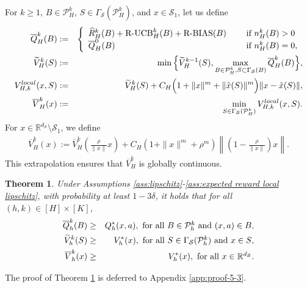 \documentclass[10pt,a4paper]{amsart}
\newtheorem{theorem}{Theorem}
\begin{document}
For $k\ge1$, $B\in\mathcal P_H^k$, $S\in\Gamma_{\mathcal S}(\mathcal P_H^k)$, and $x\in\mathcal S_1$, let us define
\begin{eqnarray}\label{eq:Q,V estimation for h=H}
     \overline{Q}_{H}^{k}(B) &:=&\left\{\begin{array}{lll}\widehat{R}_{H}^{k}(B)+\mbox{\rm R-UCB}_{H}^{k}(B)+\mbox{\rm R-BIAS}(B) && \mbox{ if } n_H^k(B)>0\\
     \overline{Q}_{H}^{0}(B) &&
       \mbox{ if } n_H^k(B)=0, 
       \end{array}\right. \nonumber\\ 
        \widetilde{V}_{H}^{k}(S)&:=&\min\Big\{\widetilde{V}_{H}^{k-1}(S), \max_{B \in \mathcal{P}_H^k,S \subset\Gamma_{\mathcal{S}}(B) }\overline{Q}_{H}^{k}(B)\Big\} ,\nonumber\\ 
         V_{H,k}^{\rm local}(x, S)&:=& \widetilde{V}_{H}^{k}(S)+C_{H}\Big(1+\|x\|^m+\|\tilde{x}(S)\|^m\Big)\|x-\tilde{x}(S)\|, \nonumber\\ 
        \overline{V}_{H}^{k}(x)&:=&\min_{S \in \Gamma_{\mathcal{S}}(\mathcal{P}_H^k)} V_{H,k}^{\rm local}(x, S).
\end{eqnarray}
For $x \in \mathbb{R}^{d_{\mathcal{S}}}\setminus\mathcal{S}_{1}$, we define 
\begin{eqnarray}\label{eq:Q,V estimation for h=H outside}
    \overline{V}_{H}^{k}(x):=\overline{V}_{H}^{k}\left(\frac{\rho}{\|x\|}x\right)+C_{H}(1+\|x\|^{m}+\rho^{m})\left\|\left(1-\frac{\rho}{\|x\|}\right)x\right\|. 
\end{eqnarray}
This extrapolation ensures that $\overline V_H^k$ is globally continuous.

\begin{theorem} \label{thm: True Upper Bounded By Estimates}
Under Assumptions \ref{ass:lipschitz}-\ref{ass:expected reward local lipschitz}, with probability at least $1-3\delta$, it holds that for all $(h,k) \in [H]\times[K]$, 
\begin{eqnarray}\label{eq:upperbound}
     \overline{Q}_{h}^{k}(B)&\geq& Q_{h}^{*}(x,a),\,\, \mbox{for all $B \in \mathcal{P}_h^k $ and  $ (x,a) \in B$}, \nonumber\\
     \widetilde{V}_{h}^{k}(S)&\geq& V_{h}^{*}(x), \,\,\mbox{for all $S \in \Gamma_{\mathcal{S}}(\mathcal{P}_h^k)$ and $x \in S$}, \nonumber\\
     \overline{V}_{h}^{k}(x)&\geq& V_{h}^{*}(x), \,\,\mbox{for all $x \in \mathbb{R}^{d_{\mathcal{S}}}$}.    
\end{eqnarray} 
\end{theorem}
The proof of Theorem \ref{thm: True Upper Bounded By Estimates} is deferred to Appendix \ref{app:proof-5-3}. \\
\end{document}
